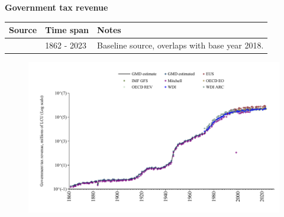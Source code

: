 \documentclass[12pt,a4paper,landscape]{article}
\begin{document}
\begin{adjustbox}{max totalsize={\paperwidth}{\paperheight},center}
\begin{minipage}[t][\textheight][t]{\textwidth}
\vspace*{0.5cm}
{}
\begin{center}
{\Large\bfseries Government tax revenue}
\end{center}
\vspace{0.5cm}
\begin{table}[H]
\centering
\small
\begin{tabular}{|l|l|l|}
\hline
\textbf{Source} & \textbf{Time span} & \textbf{Notes} \\
\hline
\rowcolor{white}\cite{GMD_estimated}& 1862 - 2023 &Baseline source, overlaps with base year 2018. \\
\hline
\end{tabular}
\end{table}
\begin{figure}[H]
\centering
\includegraphics[width=\textwidth,height=0.6\textheight,keepaspectratio]{graphs/ITA_govtax.pdf}
\end{figure}
\end{minipage}
\end{adjustbox}
\end{document}
